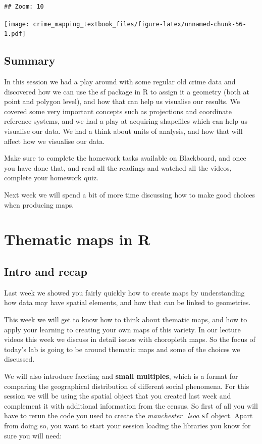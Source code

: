 \documentclass[
]{book}
\begin{document}
\begin{verbatim}
## Zoom: 10
\end{verbatim}

\texttt{[image: crime\_mapping\_textbook\_files/figure-latex/unnamed-chunk-56-1.pdf]}

\hypertarget{summary-1}{%
\section{Summary}\label{summary-1}}

In this session we had a play around with some regular old crime data and discovered how we can use the sf package in R to assign it a geometry (both at point and polygon level), and how that can help us visualise our results. We covered some very important concepts such as projections and coordinate reference systems, and we had a play at acquiring shapefiles which can help us visualise our data. We had a think about units of analysis, and how that will affect how we visualise our data.

Make sure to complete the homework tasks available on Blackboard, and once you have done that, and read all the readings and watched all the videos, complete your homework quiz.

Next week we will spend a bit of more time discussing how to make good choices when producing maps.

\hypertarget{thematic-maps-in-r}{%
\chapter{Thematic maps in R}\label{thematic-maps-in-r}}

\hypertarget{intro-and-recap}{%
\section{Intro and recap}\label{intro-and-recap}}

Last week we showed you fairly quickly how to create maps by understanding how data may have spatial elements, and how that can be linked to geometries.

This week we will get to know how to think about thematic maps, and how to apply your learning to creating your own maps of this variety. In our lecture videos this week we discuss in detail issues with choropleth maps. So the focus of today's lab is going to be around thematic maps and some of the choices we discussed.

We will also introduce faceting and \textbf{small multiples}, which is a format for comparing the geographical distribution of different social phenomena. For this session we will be using the spatial object that you created last week and complement it with additional information from the census. So first of all you will have to rerun the code you used to create the \emph{manchester\_lsoa} \texttt{sf} object. Apart from doing so, you want to start your session loading the libraries you know for sure you will need:
\end{document}
